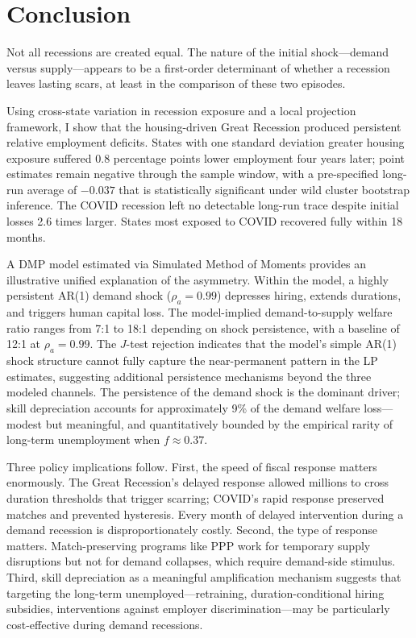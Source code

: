 \documentclass[12pt]{article}
\begin{document}
\section{Conclusion}
\label{sec:conclusion}

Not all recessions are created equal. The nature of the initial shock---demand versus supply---appears to be a first-order determinant of whether a recession leaves lasting scars, at least in the comparison of these two episodes.

Using cross-state variation in recession exposure and a local projection framework, I show that the housing-driven Great Recession produced persistent relative employment deficits. States with one standard deviation greater housing exposure suffered 0.8 percentage points lower employment four years later; point estimates remain negative through the sample window, with a pre-specified long-run average of $-0.037$ that is statistically significant under wild cluster bootstrap inference. The COVID recession left no detectable long-run trace despite initial losses 2.6 times larger. States most exposed to COVID recovered fully within 18 months.

A DMP model estimated via Simulated Method of Moments provides an illustrative unified explanation of the asymmetry. Within the model, a highly persistent AR(1) demand shock ($\rho_a = 0.99$) depresses hiring, extends durations, and triggers human capital loss. The model-implied demand-to-supply welfare ratio ranges from 7:1 to 18:1 depending on shock persistence, with a baseline of 12:1 at $\rho_a = 0.99$. The $J$-test rejection indicates that the model's simple AR(1) shock structure cannot fully capture the near-permanent pattern in the LP estimates, suggesting additional persistence mechanisms beyond the three modeled channels. The persistence of the demand shock is the dominant driver; skill depreciation accounts for approximately 9\% of the demand welfare loss---modest but meaningful, and quantitatively bounded by the empirical rarity of long-term unemployment when $f \approx 0.37$.

Three policy implications follow. First, the speed of fiscal response matters enormously. The Great Recession's delayed response allowed millions to cross duration thresholds that trigger scarring; COVID's rapid response preserved matches and prevented hysteresis. Every month of delayed intervention during a demand recession is disproportionately costly. Second, the type of response matters. Match-preserving programs like PPP work for temporary supply disruptions but not for demand collapses, which require demand-side stimulus. Third, skill depreciation as a meaningful amplification mechanism suggests that targeting the long-term unemployed---retraining, duration-conditional hiring subsidies, interventions against employer discrimination---may be particularly cost-effective during demand recessions.
\end{document}
